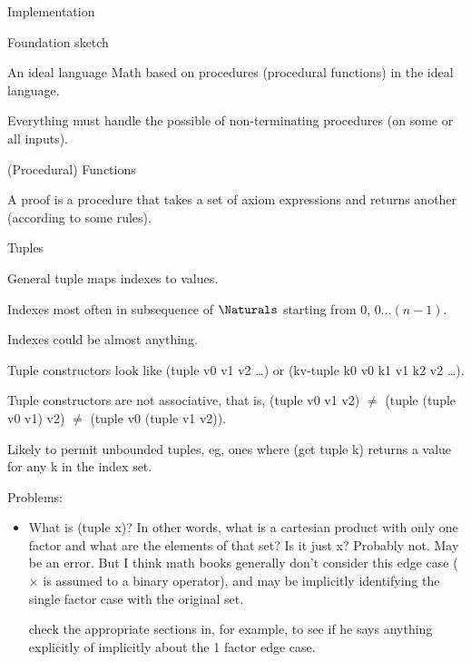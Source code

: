\documentclass[11pt]{PalisadesLakesBook}
\begin{document}
\begin{plSection}{Implementation}
\begin{plSection}{Foundation sketch}
\begin{plSection}{An ideal language}
Math based on procedures (procedural functions) 
in the ideal language.

Everything must handle the possible of non-terminating procedures
(on some or all inputs).
\end{plSection}%
\begin{plSection}{(Procedural) Functions} 

A proof is a procedure that takes a set of axiom expressions
and returns another (according to some rules).

\end{plSection}%
\begin{plSection}{Tuples} 

General tuple maps indexes to values.

Indexes most often in subsequence of $\Naturals$ starting from
$0$, $0 \ldots (n-1)$.

Indexes could be almost anything.

Tuple constructors look like
{\pseudocodeFont (tuple v0 v1 v2 {\ldots})} 
or
{\pseudocodeFont (kv-tuple k0 v0 k1 v1 k2 v2 {\ldots})}.

Tuple constructors are not associative, that is,
  {\pseudocodeFont (tuple v0 v1 v2)}
  $\neq$
  {\pseudocodeFont (tuple (tuple v0 v1) v2)}
$\neq$
  {\pseudocodeFont (tuple v0 (tuple v1 v2))}.


Likely to permit unbounded tuples, eg, ones where
{\pseudocodeFont (get tuple k)}
returns a value for any {\pseudocodeFont k} in the index set.

Problems:
\begin{itemize}
  \item What is {\pseudocodeFont (tuple x)}?
  In other words, what is a cartesian product 
  with only one factor and what are the elements of that set?
  Is it just {\pseudocodeFont x}? 
  Probably not. May be an error.
  But I think math books generally don't consider this edge case
  ($\times$ is assumed to a binary operator),
  and may  be implicitly identifying the single factor case
  with the original set.
  
  \TODO check the appropriate sections in,
  for example, 
  to see if he says anything explicitly of implicitly about
  the 1 factor edge case.
  

\end{itemize}
\end{plSection}
\end{plSection}
\end{plSection}
\end{document}
